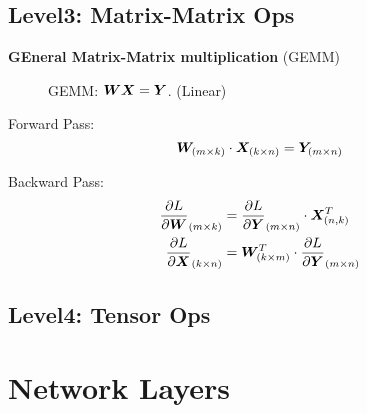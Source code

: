 \documentclass[9pt,twocolumn,times]{article}
\begin{document}
\subsection{Level3: Matrix-Matrix Ops}

	\textbf{GEneral Matrix-Matrix multiplication} (GEMM)

\begin{figure}[h]
	\centering
	\resizebox{0.618\columnwidth}{!}{%
		
	}
	\caption{GEMM: ${\bm{W}} {\bm{X}} = {\bm{Y}}$. (Linear)}
\end{figure}

	Forward Pass:
	\begin{equation}
		{\bm{W}}_{(m\times k)} \cdot {\bm{X}}_{(k\times n)} = {\bm{Y}}_{(m\times n)}
	\end{equation}

	Backward Pass:
	\begin{align}
		\frac{\partial L}{\partial{\bm{W}}}_{(m\times k)} &=
		\frac{\partial L}{\partial{\bm{Y}}}_{(m\times n)} \cdot {\bm{X}}^T_{(n,k)}\\
		\frac{\partial L}{\partial{\bm{X}}}_{(k\times n)} &=
		{\bm{W}}^T_{(k\times m)} \cdot \frac{\partial L}{\partial {\bm{Y}}}_{(m\times n)}
	\end{align}

\subsection{Level4: Tensor Ops}

\section{Network Layers}
\end{document}
